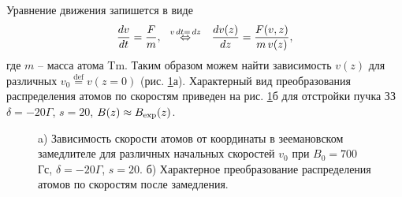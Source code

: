 Уравнение движения запишется в виде
\begin{equation}
    \frac{d v}{d t} = \frac{F}{m},
    \hspace{0.25cm} \overset{v \, d t = \, d z}{\Leftrightarrow}  \hspace{0.25cm}
    \frac{d v(z)}{d z} = \frac{F(v, z)}{m \, v(z)},
\end{equation}
где $m$ -- масса атома Tm. Таким образом можем найти зависимость $v(z)$ для различных $v_0 \overset{\mathrm{def}}{=} v(z=0)$ (рис. \ref{fig:vZz}а). Характерный вид преобразования распределения атомов по скоростям приведен на рис. \ref{fig:vZz}б для отстройки пучка ЗЗ $\delta = -20\Gamma$, $s=20$, $B(z) \approx B_{\textnormal{exp}}(z)$. 
\begin{figure}[ht]
    \centering
    \hspace{5 mm} 
    \vspace{-3mm}
    \caption{a) Зависимость скорости атомов от координаты в зеемановском замедлителе  для различных начальных скоростей $v_0$ при $B_0 = 700\,$Гс, $\delta=-20\Gamma$, $s=20$. б) Характерное преобразование распределения атомов по скоростям после замедления. }
    \label{fig:vZz}
\end{figure}

